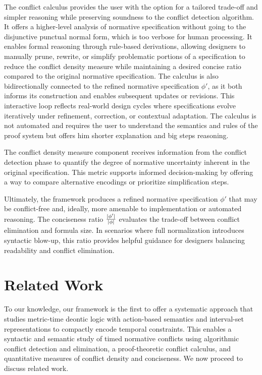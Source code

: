         The conflict calculus provides the user with the option for a tailored trade-off and simpler reasoning while preserving soundness to the conflict detection algorithm. It offers a higher-level analysis of normative specification without going to the disjunctive punctual normal form, which is too verbose for human processing. It enables formal reasoning through rule-based derivations, allowing designers to manually prune, rewrite, or simplify problematic portions of a specification to reduce the conflict density measure while maintaining a desired concise ratio compared to the original normative specification. The calculus is also bidirectionally connected to the refined normative specification $\phi'$, as it both informs its construction and enables subsequent updates or revisions. This interactive loop reflects real-world design cycles where specifications evolve iteratively under refinement, correction, or contextual adaptation. The calculus is not automated and requires the user to understand the semantics and rules of the proof system but offers him shorter explanation and big steps reasoning. 
        
        The conflict density measure component receives information from the conflict detection phase to quantify the degree of normative uncertainty inherent in the original specification. This metric supports informed decision-making by offering a way to compare alternative encodings or prioritize simplification steps.
        
        Ultimately, the framework produces a refined normative specification $\phi'$ that may be conflict-free and, ideally, more amenable to implementation or automated reasoning. The conciseness ratio $\frac{\vert \phi'\vert}{\vert \phi\vert}$ evaluates the trade-off between conflict elimination and formula size. In scenarios where full normalization introduces syntactic blow-up, this ratio provides helpful guidance for designers balancing readability and conflict elimination.
        
        

        \section{Related Work}

To our knowledge, our framework is the first to offer a systematic approach that studies metric-time deontic logic with action-based semantics and interval-set representations to compactly encode temporal constraints. This enables a syntactic and semantic study of timed normative conflicts using algorithmic conflict detection and elimination, a proof-theoretic conflict calculus, and quantitative measures of conflict density and conciseness. We now proceed to discuss related work.


